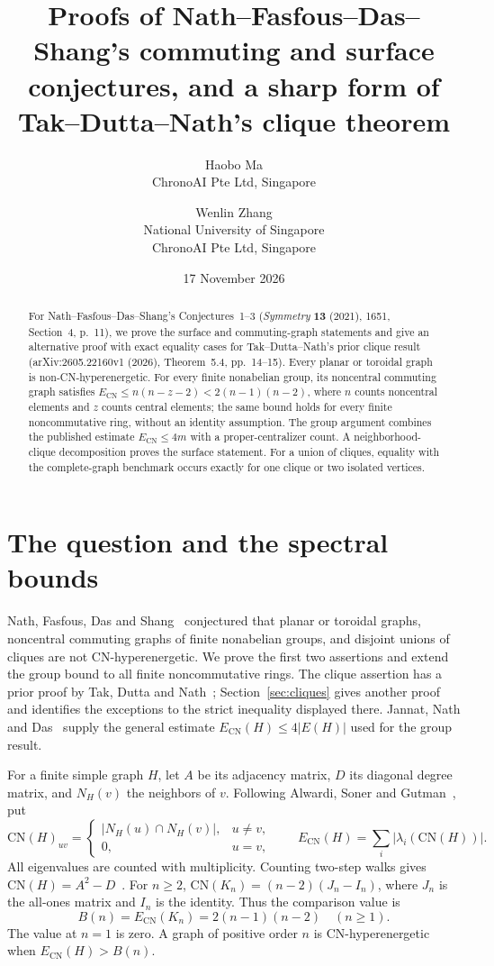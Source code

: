 \documentclass[11pt]{article}
\title{Proofs of Nath--Fasfous--Das--Shang's commuting and surface conjectures, and a sharp form of Tak--Dutta--Nath's clique theorem}
\author{Haobo Ma\\\small ChronoAI Pte Ltd, Singapore
\and Wenlin Zhang\\\small National University of Singapore\\\small ChronoAI Pte Ltd, Singapore}
\date{17 November 2026}
\newcommand{\ECN}{E_{\mathrm{CN}}}
\newcommand{\CN}{\mathrm{CN}}
\begin{document}
\maketitle
\begin{abstract}
For Nath--Fasfous--Das--Shang's Conjectures~1--3
(\emph{Symmetry} \textbf{13} (2021), 1651, Section~4, p.~11), we prove
the surface and commuting-graph statements and give an alternative proof
with exact equality cases for Tak--Dutta--Nath's prior clique result
(arXiv:2605.22160v1 (2026), Theorem~5.4, pp.~14--15).
Every planar or toroidal graph is non-CN-hyperenergetic.
For every finite nonabelian group, its noncentral commuting graph satisfies
$\ECN\le n(n-z-2)<2(n-1)(n-2)$, where $n$ counts noncentral elements
and $z$ counts central elements; the same bound holds for every finite
noncommutative ring, without an identity assumption.
The group argument combines the published estimate $\ECN\le4m$ with a
proper-centralizer count. A neighborhood-clique decomposition proves the
surface statement. For a union of cliques, equality with the complete-graph
benchmark occurs exactly for one clique or two isolated vertices.
\end{abstract}

\section{The question and the spectral bounds}
Nath, Fasfous, Das and Shang~\cite{NFDS} conjectured that planar or
toroidal graphs, noncentral commuting graphs of finite nonabelian groups,
and disjoint unions of cliques are not CN-hyperenergetic.
We prove the first two assertions and extend the group bound to all finite
noncommutative rings. The clique assertion has a prior proof by Tak, Dutta
and Nath~\cite[Theorem~5.4]{TDN}; Section~\ref{sec:cliques} gives another
proof and identifies the exceptions to the strict inequality displayed there.
Jannat, Nath and Das~\cite[Remark~4.7, equation~(6), p.~15]{JND} supply
the general estimate $\ECN(H)\le4|E(H)|$ used for the group result.

For a finite simple graph $H$, let $A$ be its adjacency matrix, $D$ its
diagonal degree matrix, and $N_H(v)$ the neighbors of $v$. Following
Alwardi, Soner and Gutman~\cite[Definitions~1.5--1.7]{ASG}, put
\[
 \CN(H)_{uv}=\begin{cases}|N_H(u)\cap N_H(v)|,&u\ne v,\\0,&u=v,\end{cases}
 \qquad \ECN(H)=\sum_i|\lambda_i(\CN(H))|.
\]
All eigenvalues are counted with multiplicity. Counting two-step walks gives
$\CN(H)=A^2-D$~\cite[Proposition~2.7]{ASG}.
For $n\ge2$, $\CN(K_n)=(n-2)(J_n-I_n)$, where $J_n$ is the all-ones
matrix and $I_n$ is the identity. Thus the comparison value is
\[
 B(n)=\ECN(K_n)=2(n-1)(n-2) \quad(n\ge1).
\]
The value at $n=1$ is zero. A graph of positive order $n$ is
CN-hyperenergetic when $\ECN(H)>B(n)$.
\end{document}
